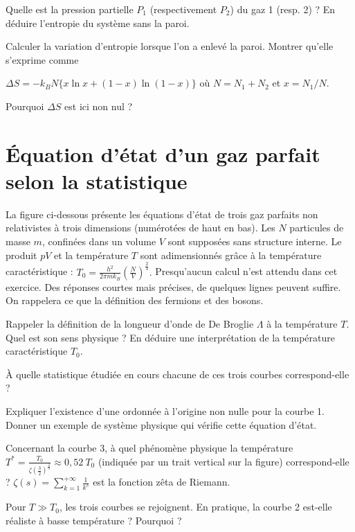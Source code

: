 \documentclass[utf8, 11pt]{feuille}
\begin{document}
\question Quelle est la pression partielle $P_1$ (respectivement $P_2$) du gaz 1 (resp. 2) ? En déduire l'entropie du système sans la paroi.

\question Calculer la variation d'entropie lorsque l'on a enlevé la paroi. Montrer qu'elle s'exprime comme

\mbox{$\Delta S = - k_B N \{ x \ln{x}+(1-x) \ln{(1-x)} \}$} où $N=N_1+N_2$ et $x=N_1/N$.

\question Pourquoi $\Delta S$ est ici non nul ?


\section{\'Equation d'état d'un gaz parfait selon la statistique}

La figure ci-dessous présente les équations d'état de trois gaz parfaits non relativistes à trois
dimensions (numérotées de haut en bas). Les $N$ particules de masse $m$, confinées dans un volume $V$ sont supposées sans
structure interne. Le produit $pV$ et la température $T$ sont adimensionnés grâce à la température
caractéristique : $T_0=\frac{h^2}{2\pi m k_B} \left( \frac{N}{V} \right)^{\frac{2}{3}}.$
Presqu'aucun calcul n'est attendu dans cet exercice. Des réponses courtes mais précises, de quelques lignes peuvent suffire. On rappelera ce que la définition des fermions et des bosons.

\question Rappeler la définition de la longueur d'onde de De Broglie $\Lambda$ à la température $T$.
Quel est son sens physique ? En déduire une interprétation de la température caractéristique $T_0$.

\question \`A quelle statistique étudiée en cours chacune de ces trois courbes correspond-elle ?

\question Expliquer l'existence d’une ordonnée à l’origine non nulle pour la courbe 1. Donner un exemple de système physique qui vérifie cette équation d'état.

\question Concernant la courbe 3, à quel phénomène physique la température $T^*=\frac{T_0}{\zeta(\frac{3}{2})^{\frac{2}{3}}} \approx  0,52 \ T_0$ (indiquée par un trait vertical sur la figure) correspond-elle ? $\zeta(s)=\sum_{k=1}^{+\infty} \frac{1}{k^s}$ est la fonction zêta de Riemann. 

\question Pour $T \gg T_0$, les trois courbes se rejoignent. En pratique, la courbe 2 est-elle réaliste à basse température ? Pourquoi ?
\end{document}
